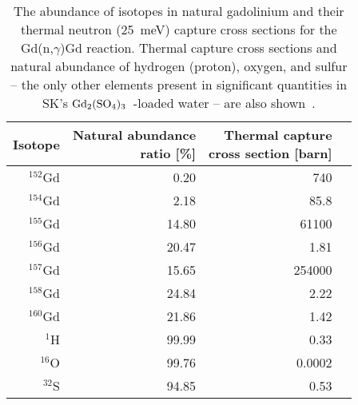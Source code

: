 \documentclass[preprint,12pt]{elsarticle}
\newcommand{\GdSO}{$\rm Gd_2(\rm SO_4)_3$\ }
\begin{document}
\begin{table}[htb]
	\centering
	\caption{The abundance of isotopes in natural gadolinium and their thermal neutron (25~meV) capture cross sections for the Gd(n,$\gamma$)Gd reaction. Thermal capture cross sections and natural abundance of hydrogen (proton), oxygen, and sulfur -- the only other elements present in significant quantities in SK's  \GdSO-loaded water -- are also shown~\cite{IUPAC2016, ENDF7}.
	}
	\label{tab:GdCrossSection}
    \vspace*{0.1cm}
	\begin{tabular}{rrrr}
		\hline
		Isotope
		& \shortstack{Natural abundance\\ratio [\%]}
		& \shortstack{Thermal capture\\cross section [barn]}
		\tabularnewline
		\hline
		${}^{152}$Gd & 0.20  & 740 \tabularnewline
		${}^{154}$Gd & 2.18  & 85.8 \tabularnewline
		${}^{155}$Gd & 14.80 & 61100 \tabularnewline
		${}^{156}$Gd & 20.47 & 1.81 \tabularnewline
		${}^{157}$Gd & 15.65 & 254000 \tabularnewline
		${}^{158}$Gd & 24.84 & 2.22 \tabularnewline
		${}^{160}$Gd & 21.86 & 1.42 \tabularnewline
		\hline
	    ${}^{1}$H & 99.99 & 0.33 \tabularnewline
		${}^{16}$O & 99.76 & 0.0002 \tabularnewline
		${}^{32}$S & 94.85 & 0.53 \tabularnewline
		\hline
	\end{tabular}
\end{table}
\end{document}
